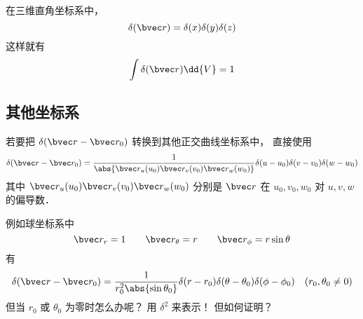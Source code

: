 
\begin{issues}
\issueDraft
\end{issues}


在三维直角坐标系中， 
\begin{equation}
\delta(\bvec r) = \delta(x)\delta(y)\delta(z)
\end{equation}
这样就有
\begin{equation}
\int \delta(\bvec r) \dd{V} = 1
\end{equation}

\subsection{其他坐标系}
若要把 $\delta(\bvec r - \bvec r_0)$ 转换到其他正交曲线坐标系中， 直接使用
\begin{equation}
\delta(\bvec r - \bvec r_0) = \frac{1}{\abs{\bvec r_u(u_0)\bvec r_v(v_0)\bvec r_w(w_0)}}\delta(u - u_0)\delta(v - v_0)\delta(w - w_0)
\end{equation}
其中 $\bvec r_u(u_0)\bvec r_v(v_0)\bvec r_w(w_0)$ 分别是 $\bvec r$ 在 $u_0,v_0,w_0$ 对 $u, v, w$ 的偏导数．

例如球坐标系中
\begin{equation}
\bvec r_r = 1 \qquad \bvec r_\theta = r \qquad \bvec r_\phi = r\sin\theta
\end{equation}
有
\begin{equation}
\delta(\bvec r - \bvec r_0) = \frac{1}{r_0^2\abs{\sin\theta_0}}\delta(r - r_0)\delta(\theta - \theta_0)\delta(\phi - \phi_0)
\quad (r_0, \theta_0 \ne 0)
\end{equation}
但当 $r_0$ 或 $\theta_0$ 为零时怎么办呢？ 用 $\delta^2$ 来表示！ 但如何证明？

